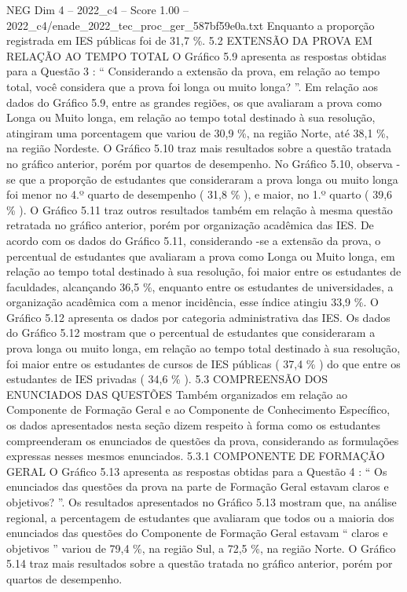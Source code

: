 \begin{textsample}{NEG Dim 4 – 2022\_c4 – Score 1.00 – 2022\_c4/enade\_2022\_tec\_proc\_ger\_587bf59e0a.txt}
Enquanto a proporção registrada em IES públicas foi de 31,7 \%. 5.2 EXTENSÃO DA PROVA EM RELAÇÃO AO TEMPO TOTAL O Gráfico 5.9 apresenta as respostas obtidas para a Questão 3 : “ Considerando a extensão da prova, em relação ao tempo total, você considera que a prova foi longa ou muito longa? ”.
Em relação aos dados do Gráfico 5.9, entre as grandes regiões, os que avaliaram a prova como Longa ou Muito longa, em relação ao tempo total destinado à sua resolução, atingiram uma porcentagem que variou de 30,9 \%, na região Norte, até 38,1 \%, na região Nordeste.
O Gráfico 5.10 traz mais resultados sobre a questão tratada no gráfico anterior, porém por quartos de desempenho.
No Gráfico 5.10, observa -se que a proporção de estudantes que consideraram a prova longa ou muito longa foi menor no 4.º quarto de desempenho ( 31,8 \% ), e maior, no 1.º quarto ( 39,6 \% ).
O Gráfico 5.11 traz outros resultados também em relação à mesma questão retratada no gráfico anterior, porém por organização acadêmica das IES.
De acordo com os dados do Gráfico 5.11, considerando -se a extensão da prova, o percentual de estudantes que avaliaram a prova como Longa ou Muito longa, em relação ao tempo total destinado à sua resolução, foi maior entre os estudantes de faculdades, alcançando 36,5 \%, enquanto entre os estudantes de universidades, a organização acadêmica com a menor incidência, esse índice atingiu 33,9 \%.
O Gráfico 5.12 apresenta os dados por categoria administrativa das IES.
Os dados do Gráfico 5.12 mostram que o percentual de estudantes que consideraram a prova longa ou muito longa, em relação ao tempo total destinado à sua resolução, foi maior entre os estudantes de cursos de IES públicas ( 37,4 \% ) do que entre os estudantes de IES privadas ( 34,6 \% ). 5.3 COMPREENSÃO DOS ENUNCIADOS DAS QUESTÕES Também organizados em relação ao Componente de Formação Geral e ao Componente de Conhecimento Específico, os dados apresentados nesta seção dizem respeito à forma como os estudantes compreenderam os enunciados de questões da prova, considerando as formulações expressas nesses mesmos enunciados. 5.3.1 COMPONENTE DE FORMAÇÃO GERAL O Gráfico 5.13 apresenta as respostas obtidas para a Questão 4 : “ Os enunciados das questões da prova na parte de Formação Geral estavam claros e objetivos? ”.
Os resultados apresentados no Gráfico 5.13 mostram que, na análise regional, a percentagem de estudantes que avaliaram que todos ou a maioria dos enunciados das questões do Componente de Formação Geral estavam “ claros e objetivos ” variou de 79,4 \%, na região Sul, a 72,5 \%, na região Norte.
O Gráfico 5.14 traz mais resultados sobre a questão tratada no gráfico anterior, porém por quartos de desempenho.

\end{textsample}
